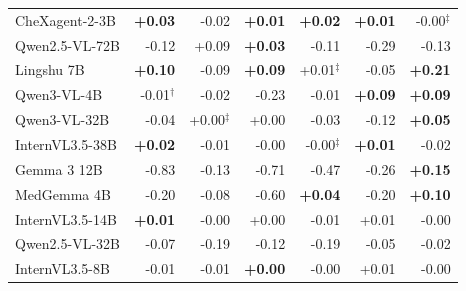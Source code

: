 \documentclass{article}
\begin{document}
\begin{table}[htbp]
{\begin{tabular}{lrrrrrr}
CheXagent-2-3B & \cellcolor{cfTerra2}\textbf{+0.03} & \cellcolor{cfSlate2}-0.02 & \cellcolor{cfTerra1}\textbf{+0.01} & \cellcolor{cfTerra1}\textbf{+0.02} & \cellcolor{cfTerra1}\textbf{+0.01} & \cellcolor{cfSlate1}-0.00$^{\ddagger}$ \\
Qwen2.5-VL-72B & \cellcolor{cfSlate3}-0.12 & \cellcolor{cfTerra2}+0.09 & \cellcolor{cfTerra2}\textbf{+0.03} & \cellcolor{cfSlate3}-0.11 & \cellcolor{cfSlate4}-0.29 & \cellcolor{cfSlate3}-0.13 \\
Lingshu 7B & \cellcolor{cfTerra2}\textbf{+0.10} & \cellcolor{cfSlate2}-0.09 & \cellcolor{cfTerra2}\textbf{+0.09} & \cellcolor{cfTerra1}+0.01$^{\ddagger}$ & \cellcolor{cfSlate2}-0.05 & \cellcolor{cfTerra3}\textbf{+0.21} \\
Qwen3-VL-4B & \cellcolor{cfSlate1}-0.01$^{\dagger}$ & \cellcolor{cfSlate1}-0.02 & \cellcolor{cfSlate3}-0.23 & \cellcolor{cfSlate1}-0.01 & \cellcolor{cfTerra2}\textbf{+0.09} & \cellcolor{cfTerra2}\textbf{+0.09} \\
Qwen3-VL-32B & \cellcolor{cfSlate2}-0.04 & \cellcolor{cfTerra1}+0.00$^{\ddagger}$ & \cellcolor{cfTerra1}+0.00 & \cellcolor{cfSlate2}-0.03 & \cellcolor{cfSlate3}-0.12 & \cellcolor{cfTerra2}\textbf{+0.05} \\
InternVL3.5-38B & \cellcolor{cfTerra1}\textbf{+0.02} & \cellcolor{cfSlate1}-0.01 & \cellcolor{cfSlate1}-0.00 & \cellcolor{cfSlate1}-0.00$^{\ddagger}$ & \cellcolor{cfTerra1}\textbf{+0.01} & \cellcolor{cfSlate2}-0.02 \\
Gemma 3 12B & \cellcolor{cfSlate4}-0.83 & \cellcolor{cfSlate3}-0.13 & \cellcolor{cfSlate4}-0.71 & \cellcolor{cfSlate4}-0.47 & \cellcolor{cfSlate4}-0.26 & \cellcolor{cfTerra3}\textbf{+0.15} \\
MedGemma 4B & \cellcolor{cfSlate3}-0.20 & \cellcolor{cfSlate2}-0.08 & \cellcolor{cfSlate4}-0.60 & \cellcolor{cfTerra2}\textbf{+0.04} & \cellcolor{cfSlate3}-0.20 & \cellcolor{cfTerra3}\textbf{+0.10} \\
InternVL3.5-14B & \cellcolor{cfTerra1}\textbf{+0.01} & \cellcolor{cfSlate1}-0.00 & \cellcolor{cfTerra1}+0.00 & \cellcolor{cfSlate1}-0.01 & \cellcolor{cfTerra1}+0.01 & \cellcolor{cfSlate1}-0.00 \\
Qwen2.5-VL-32B & \cellcolor{cfSlate2}-0.07 & \cellcolor{cfSlate3}-0.19 & \cellcolor{cfSlate3}-0.12 & \cellcolor{cfSlate3}-0.19 & \cellcolor{cfSlate2}-0.05 & \cellcolor{cfSlate2}-0.02 \\
InternVL3.5-8B & \cellcolor{cfSlate1}-0.01 & \cellcolor{cfSlate1}-0.01 & \cellcolor{cfTerra1}\textbf{+0.00} & \cellcolor{cfSlate1}-0.00 & \cellcolor{cfTerra1}+0.01 & \cellcolor{cfSlate1}-0.00 \\

\end{tabular}}
\end{table}
\end{document}
